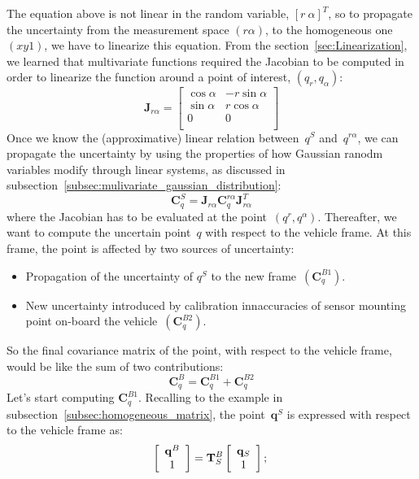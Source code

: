 The equation above is not linear in the random variable, $[r\ \alpha]^T$, so to propagate the uncertainty from the measurement space $(r\alpha)$, to the homogeneous one $(xy1)$, we have to linearize this equation. From the section~\ref{sec:Linearization}, we learned that multivariate functions required the Jacobian to be computed in order to linearize the function around a point of interest, $(q_r,q_{\alpha})$:
\begin{equation}
 \mathbf{J}_{r\alpha} = 
 \left[
 \begin{array}{cc}
 \cos \alpha  & -r\sin \alpha \\
 \sin \alpha  &  r\cos \alpha \\
 0	      & 0	      \\
 \end{array}
 \right]
\end{equation}
Once we know the (approximative) linear relation between~$q^S$ and~$q^{r\alpha}$, we can propagate the uncertainty by using the properties of how Gaussian ranodm variables modify through linear systems, as discussed in subsection~\ref{subsec:mulivariate_gaussian_distribution}:
\begin{equation}
 \mathbf{C}^S_q = \mathbf{J}_{r\alpha}\mathbf{C}^{r\alpha}_q\mathbf{J}_{r\alpha}^T
\end{equation}
where the Jacobian has to be evaluated at the point~$(q^r,q^{\alpha})$. Thereafter, we want to compute the uncertain point~$q$ with respect to the vehicle frame. At this frame, the point is affected by two sources of uncertainty:
\begin{itemize}
 \item Propagation of the uncertainty of $q^S$ to the new frame~$(\mathbf{C}^{B1}_q)$.
 \item New uncertainty introduced by calibration innaccuracies of sensor mounting point on-board the vehicle~$(\mathbf{C}^{B2}_q)$.
\end{itemize}
So the final covariance matrix of the point, with respect to the vehicle frame, would be like the sum of two contributions:
\begin{equation}
 \mathbf{C}^{B}_q = \mathbf{C}^{B1}_q + \mathbf{C}^{B2}_q
\end{equation}
Let's start computing $\mathbf{C}^{B1}_q$. Recalling to the example in subsection~\ref{subsec:homogeneous_matrix}, the point~$\mathbf{q}^S$ is expressed with respect to the vehicle frame as:
\begin{equation}
\left[
 \begin{array}{c}
  \mathbf{q}^B\\
  1 \\
 \end{array}
\right] 
= 
\mathbf{T}^B_S 
\left[
\begin{array}{c}
    \mathbf{q}_S\\
    1 \\
 \end{array}
\right];\\
\end{equation}
